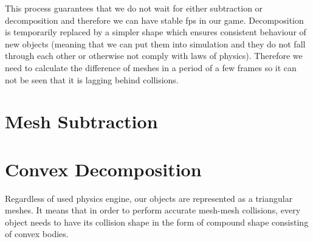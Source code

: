 This process guarantees that we do not wait for either subtraction or decomposition and therefore we can have stable fps in our game. Decomposition is temporarily replaced by a simpler shape which ensures consistent behaviour of new objects (meaning that we can put them into simulation and they do not fall through each other or otherwise not comply with laws of physics). Therefore we need to calculate the difference of meshes in a period of a few frames so it can not be seen that it is lagging behind collisions.


\section{Mesh Subtraction}
\label{sec:subtraction}

\section{Convex Decomposition}
\label{sec:decomposition}
Regardless of used physics engine, our objects are represented as a triangular meshes. It means that in order to perform accurate mesh-mesh collisions, every object needs to have its collision shape in the form of compound shape consisting of convex bodies.

